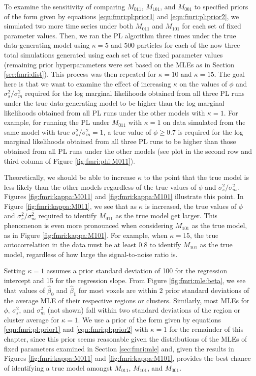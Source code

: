 To examine the sensitivity of comparing $M_{011}$, $M_{101}$, and $M_{001}$ to specified priors of the form given by equations \eqref{eqn:fmri:pl:prior1} and \eqref{eqn:fmri:pl:prior2}, we simulated two more time series under both $M_{011}$ and $M_{101}$ for each set of fixed parameter values. Then, we ran the PL algorithm three times under the true data-generating model using $\kappa = 5$ and 500 particles for each of the now three total simulations generated using each set of true fixed parameter values (remaining prior hyperparameters were set based on the MLEs as in Section \ref{sec:fmri:dist}). This process was then repeated for $\kappa = 10$ and $\kappa = 15$. The goal here is that we want to examine the effect of increasing $\kappa$ on the values of $\phi$ and $\sigma^2_s / \sigma^2_m$ required for the log marginal likelihoods obtained from all three PL runs under the true data-generating model to be higher than the log marginal likelihoods obtained from all PL runs under the other models with $\kappa = 1$. For example, for running the PL under $M_{011}$ with $\kappa = 1$ on data simulated from the same model with true $\sigma^2_s / \sigma^2_m = 1$, a true value of $\phi \ge 0.7$ is required for the log marginal likelihoods obtained from all three PL runs to be higher than those obtained from all PL runs under the other models (see plot in the second row and third column of Figure \ref{fig:fmri:phi:M011}).

Theoretically, we should be able to increase $\kappa$ to the point that the true model is less likely than the other models regardless of the true values of $\phi$ and $\sigma^2_s / \sigma^2_m$. Figures \ref{fig:fmri:kappa:M011} and \ref{fig:fmri:kappa:M101} illustrate this point. In Figure \ref{fig:fmri:kappa:M011}, we see that as $\kappa$ is increased, the true values of $\phi$ and $\sigma^2_s / \sigma^2_m$ required to identify $M_{011}$ as the true model get larger. This phenomenon is even more pronounced when considering $M_{101}$ as the true model, as in Figure \ref{fig:fmri:kappa:M101}. For example, when $\kappa = 15$, the true autocorrelation in the data must be at least 0.8 to identify $M_{101}$ as the true model, regardless of how large the signal-to-noise ratio is.

Setting $\kappa = 1$ assumes a prior standard deviation of 100 for the regression intercept and 15 for the regression slope. From Figure \ref{fig:fmri:mle:beta}, we see that values of $\hat{\beta}_0$ and $\hat{\beta}_1$ for most voxels are within 2 prior standard deviations of the average MLE of their respective regions or clusters. Similarly, most MLEs for $\phi$, $\sigma^2_s$, and $\sigma^2_m$ (not shown) fall within two standard deviations of the region or cluster average for $\kappa = 1$. We use a prior of the form given by equations \eqref{eqn:fmri:pl:prior1} and \eqref{eqn:fmri:pl:prior2} with $\kappa = 1$ for the remainder of this chapter, since this prior seems reasonable given the distributions of the MLEs of fixed parameters examined in Section \ref{sec:fmri:mle} and, given the results in Figures \ref{fig:fmri:kappa:M011} and \ref{fig:fmri:kappa:M101}, provides the best chance of identifying a true model amongst $M_{011}$, $M_{101}$, and $M_{001}$.

